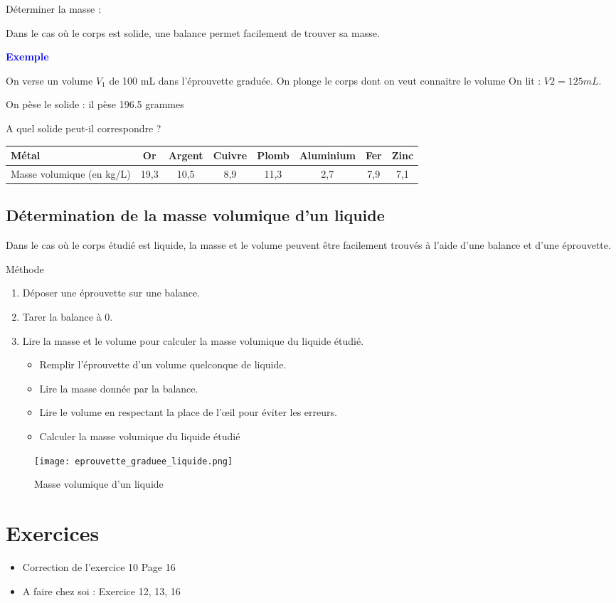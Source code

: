 \documentclass[a4paper,12pt]{article}
\begin{document}
Déterminer la masse : \par
Dans le cas où le corps est solide, une balance permet facilement de trouver sa masse.

\textbf{\textcolor{blue}{Exemple}} \par 

On verse un volume \(V_1\) de 100 mL dans l'éprouvette graduée.
On plonge le corps dont on veut connaitre le volume
On lit : \(V2 = 125 mL\).

On pèse le solide : il pèse 196.5 grammes

A quel solide peut-il correspondre ?

\begin{tabular}{|l|c|c|c|c|c|c|c|}
  \hline
  Métal & Or & Argent & Cuivre & Plomb & Aluminium & Fer & Zinc \\
  \hline
  Masse volumique (en kg/L) & 19,3 & 10,5 & 8,9 & 11,3 & 2,7 & 7,9 & 7,1 \\
  \hline
  \end{tabular}


\subsection*{Détermination de la masse volumique d'un liquide}

Dans le cas où le corps étudié est liquide, la masse et le volume peuvent être facilement trouvés à l'aide d'une balance et d'une éprouvette.

Méthode

\begin{enumerate}[noitemsep]
  \item Déposer une éprouvette sur une balance.
  \item Tarer la balance à 0.
  \item Lire la masse et le volume pour calculer la masse volumique du liquide étudié.
  \begin{itemize}
    \item Remplir l'éprouvette d'un volume quelconque de liquide.
    \item Lire la masse donnée par la balance.
    \item Lire le volume en respectant la place de l’œil pour éviter les erreurs. 
    \item Calculer la masse volumique du liquide étudié
  \end{itemize}
\end{enumerate}

\begin{figure}[H]
  \centering
  \texttt{[image: eprouvette\_graduee\_liquide.png]}
  \caption{\label{} Masse  volumique d'un liquide}
\end{figure}


\section*{Exercices}


\begin{tcolorbox}[colback=blue!10!white, colframe=blue!75!black, title=Exemples - Application]
  \begin{itemize}[noitemsep]
    \item Correction de l'exercice 10 Page 16
    \item A faire chez soi : Exercice 12, 13, 16
  \end{itemize}
\end{tcolorbox}
\end{document}
